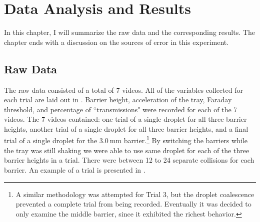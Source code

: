 \chapter{Data Analysis and Results}

In this chapter, I will summarize the raw data and the corresponding results. The chapter ends with a discussion on the sources of error in this experiment.

\section{Raw Data}



The raw data consisted of a total of 7 videos. All of the variables collected for each trial are laid out in . Barrier height, acceleration of the tray, Faraday threshold, and percentage of ``transmissions" were recorded for each of the 7 videos. The 7 videos contained: one trial of a single droplet for all three barrier heights, another trial of a single droplet for all three barrier heights, and a final trial of a single droplet for the $3.0~\mathrm{mm}$ barrier.\footnote{A similar methodology was attempted for Trial 3, but the droplet coalescence prevented a complete trial from being recorded. Eventually it was decided to only examine the middle barrier, since it exhibited the richest behavior.} By switching the barriers while the tray was still shaking we were able to use same droplet for each of the three barrier heights in a trial. There were between 12 to 24 separate collisions for each barrier. An example of a trial is presented in .

